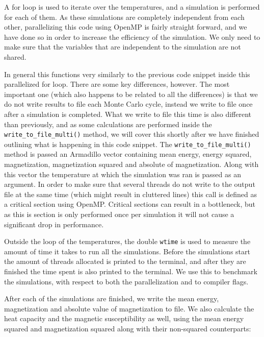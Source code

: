 \documentclass[reprint,english,notitlepage]{revtex4-1}  %
\begin{document}
A for loop is used to iterate over the temperatures, and a simulation is performed for each of them. As these simulations are completely independent from each other, parallelizing this code using OpenMP is fairly straight forward, and we have done so in order to increase the efficiency of the simulation. We only need to make sure that the variables that are independent to the simulation are not shared. 

In general this functions very similarly to the previous code snippet inside this parallelized for loop. There are some key differences, however. The most important one (which also happens to be related to all the differences) is that we do not write results to file each Monte Carlo cycle, instead we write to file once after a simulation is completed. What we write to file this time is also different than previously, and as some calculations are performed inside the \verb+write_to_file_multi()+ method, we will cover this shortly after we have finished outlining what is happening in this code snippet. The \verb+write_to_file_multi()+ method is passed an Armadillo \citep{Armadillo} vector containing mean energy, energy squared, magnetization, magnetization squared and absolute of magnetization. Along with this vector the temperature at which the simulation was ran is passed as an argument. In order to make sure that several threads do not write to the output file at the same time (which might result in cluttered lines) this call is defined as a critical section using OpenMP. Critical sections can result in a bottleneck, but as this is section is only performed once per simulation it will not cause a significant drop in performance.

Outside the loop of the temperatures, the double \verb+wtime+ is used to measure the amount of time it takes to run all the simulations. Before the simulations start the amount of threads allocated is printed to the terminal, and after they are finished the time spent is also printed to the terminal. We use this to benchmark the simulations, with respect to both the parallelization and to compiler flags.

After each of the simulations are finished, we write the mean energy, magnetization and absolute value of magnetization to file. We also calculate the heat capacity and the magnetic susceptibility as well, using the mean energy squared and magnetization squared along with their non-squared counterparts:
\end{document}
